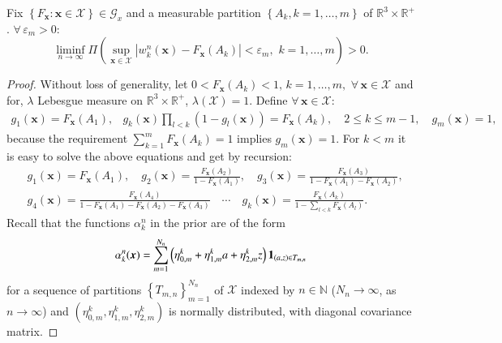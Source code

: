 \begin{lemma}\label{lemma: approximation property prior}
Fix $\left\{F_{\boldsymbol{x}}: \boldsymbol{x} \in \mathcal{X}\right\} \in \mathscr{G}_x$ and a measurable partition $\left\{A_k, k=1, \ldots, m\right\}$ of $\mathbb{R}^3 \times \mathbb{R}^{+}$. $\forall \, \varepsilon_m >0$:
$$
\liminf_{n \rightarrow \infty} \Pi \left(\sup_{\boldsymbol{x} \in \mathcal{X}} \left|w_k^n(\boldsymbol{x})-F_{\boldsymbol{x}}\left(A_k\right)\right| <\varepsilon_m, \, \, k=1, \ldots, m\right)>0.
$$    
\end{lemma}
\begin{proof}
Without loss of generality, let $0<F_{\boldsymbol{x}}\left(A_k\right)<1, \, k=1, \ldots, m, \, \,  \forall \, \boldsymbol{x} \in \mathcal{X}$ and for, $\lambda$ Lebesgue measure on $\mathbb{R}^3 \times \mathbb{R}^+$, $\lambda(\mathcal{X}) = 1$. Define $\forall \, \boldsymbol{x} \in \mathcal{X}$:
$$
\begin{array}{ll}
g_1(\boldsymbol{x})=F_{\boldsymbol{x}}\left(A_1\right), & g_k(\boldsymbol{x}) \prod_{l<k}\left(1-g_l(\boldsymbol{x})\right)=F_{\boldsymbol{x}}\left(A_k\right), \quad 2 \leqslant k \leqslant m-1, \quad g_m(\boldsymbol{x})=1,
\end{array}
$$
because the requirement $\sum_{k=1}^m F_{\boldsymbol{x}}(A_k) = 1$ implies $g_m(\boldsymbol{x})=1$. For $k <m$ it is easy to solve the above equations and get by recursion:
$$
\begin{aligned}
& g_1(\boldsymbol{x})=F_{\boldsymbol{x}}\left(A_1\right), \quad g_2(\boldsymbol{x})=\frac{F_{\boldsymbol{x}}\left(A_2\right)}{1-F_{\boldsymbol{x}}\left(A_1\right)}, \quad g_3(\boldsymbol{x})=\frac{F_{\boldsymbol{x}}\left(A_3\right)}{1-F_{\boldsymbol{x}}\left(A_1\right)-F_{\boldsymbol{x}}\left(A_2\right)}, \\
& g_4(\boldsymbol{x})=\frac{F_{\boldsymbol{x}}\left(A_4\right)}{1-F_{\boldsymbol{x}}\left(A_1\right)-F_{\boldsymbol{x}}\left(A_2\right)-F_{\boldsymbol{x}}\left(A_3\right)} \quad \cdots \quad g_k(\boldsymbol{x})=\frac{F_{\boldsymbol{x}}\left(A_k\right)}{1-\sum_{l<k} F_{\boldsymbol{x}}\left(A_l\right)}.
\end{aligned}
$$
Recall that the functions $\alpha_k^n$ in the prior are of the form
\begin{align}\label{eq: recall alphas}
\alpha_k^n(\boldsymbol{x})=\sum_{m=1}^{N_n}\left(\eta_{0, m}^k+\eta_{1, m}^k a+\eta_{2, m}^k z\right) \mathbf{1}_{(a, z) \in T_{m, n}}
\end{align}
for a sequence of partitions $\left\{T_{m, n}  \right\}_{m=1}^{N_{n}}$ of $\mathcal{X}$ indexed by $n \in \mathbb{N}$ ($N_n \rightarrow \infty$, as $n \rightarrow \infty$) and $\left(\eta_{0, m}^k, \eta_{1, m}^k, \eta_{2, m}^k \right)$ is normally distributed, with diagonal covariance matrix. 


\end{proof}
